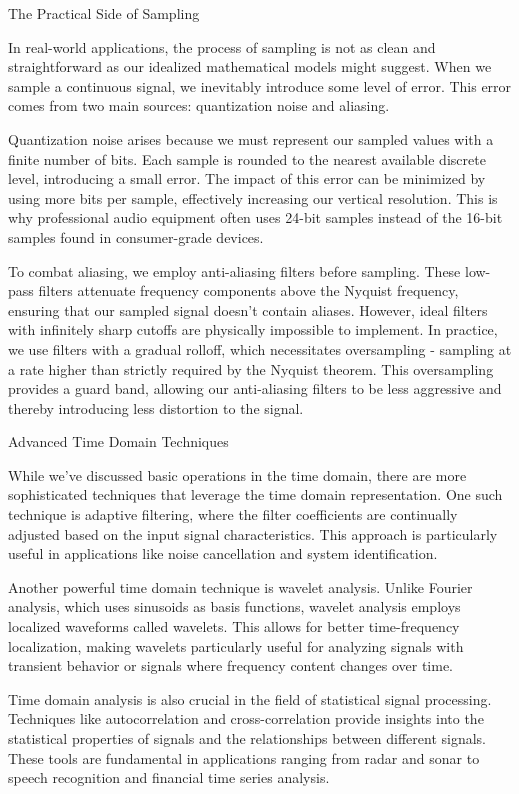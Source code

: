The Practical Side of Sampling

In real-world applications, the process of sampling is not as clean and straightforward as our idealized mathematical models might suggest. When we sample a continuous signal, we inevitably introduce some level of error. This error comes from two main sources: quantization noise and aliasing.

Quantization noise arises because we must represent our sampled values with a finite number of bits. Each sample is rounded to the nearest available discrete level, introducing a small error. The impact of this error can be minimized by using more bits per sample, effectively increasing our vertical resolution. This is why professional audio equipment often uses 24-bit samples instead of the 16-bit samples found in consumer-grade devices.

To combat aliasing, we employ anti-aliasing filters before sampling. These low-pass filters attenuate frequency components above the Nyquist frequency, ensuring that our sampled signal doesn't contain aliases. However, ideal filters with infinitely sharp cutoffs are physically impossible to implement. In practice, we use filters with a gradual rolloff, which necessitates oversampling - sampling at a rate higher than strictly required by the Nyquist theorem. This oversampling provides a guard band, allowing our anti-aliasing filters to be less aggressive and thereby introducing less distortion to the signal.

Advanced Time Domain Techniques

While we've discussed basic operations in the time domain, there are more sophisticated techniques that leverage the time domain representation. One such technique is adaptive filtering, where the filter coefficients are continually adjusted based on the input signal characteristics. This approach is particularly useful in applications like noise cancellation and system identification.

Another powerful time domain technique is wavelet analysis. Unlike Fourier analysis, which uses sinusoids as basis functions, wavelet analysis employs localized waveforms called wavelets. This allows for better time-frequency localization, making wavelets particularly useful for analyzing signals with transient behavior or signals where frequency content changes over time.

Time domain analysis is also crucial in the field of statistical signal processing. Techniques like autocorrelation and cross-correlation provide insights into the statistical properties of signals and the relationships between different signals. These tools are fundamental in applications ranging from radar and sonar to speech recognition and financial time series analysis.

